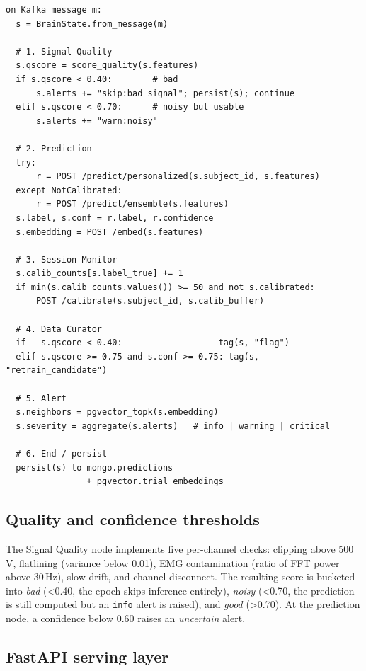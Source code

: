\documentclass[conference]{IEEEtran}
\begin{document}
\begin{lstlisting}[caption={Per-epoch flow through the LangGraph
consumer.}, label=alg:graph, captionpos=b]
on Kafka message m:
  s = BrainState.from_message(m)

  # 1. Signal Quality
  s.qscore = score_quality(s.features)
  if s.qscore < 0.40:        # bad
      s.alerts += "skip:bad_signal"; persist(s); continue
  elif s.qscore < 0.70:      # noisy but usable
      s.alerts += "warn:noisy"

  # 2. Prediction
  try:
      r = POST /predict/personalized(s.subject_id, s.features)
  except NotCalibrated:
      r = POST /predict/ensemble(s.features)
  s.label, s.conf = r.label, r.confidence
  s.embedding = POST /embed(s.features)

  # 3. Session Monitor
  s.calib_counts[s.label_true] += 1
  if min(s.calib_counts.values()) >= 50 and not s.calibrated:
      POST /calibrate(s.subject_id, s.calib_buffer)

  # 4. Data Curator
  if   s.qscore < 0.40:                   tag(s, "flag")
  elif s.qscore >= 0.75 and s.conf >= 0.75: tag(s, "retrain_candidate")

  # 5. Alert
  s.neighbors = pgvector_topk(s.embedding)
  s.severity = aggregate(s.alerts)   # info | warning | critical

  # 6. End / persist
  persist(s) to mongo.predictions
                + pgvector.trial_embeddings
\end{lstlisting}

\subsection{Quality and confidence thresholds}

The Signal Quality node implements five per-channel checks: clipping above
500\,\textmu V, flatlining (variance below 0.01), EMG contamination (ratio of
FFT power above 30\,Hz), slow drift, and channel disconnect. The resulting
score is bucketed into \emph{bad} (\textless 0.40, the epoch skips inference
entirely), \emph{noisy} (\textless 0.70, the prediction is still computed
but an \texttt{info} alert is raised), and \emph{good} (\textgreater 0.70).
At the prediction node, a confidence below 0.60 raises an \emph{uncertain}
alert.

\subsection{FastAPI serving layer}
\end{document}

